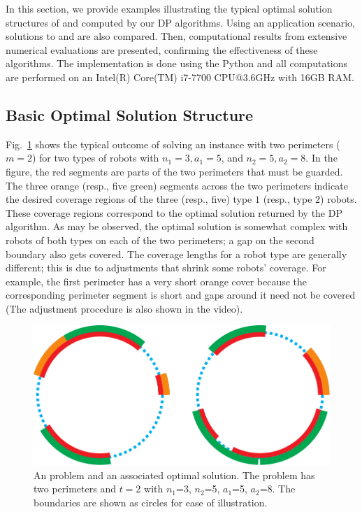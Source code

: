 In this section, we provide examples illustrating the typical 
optimal solution structures of \opglr and \opgmc computed by 
our DP algorithms. Using an application scenario, solutions to 
\opglr and \opgmc are also compared. Then, computational 
results from extensive numerical evaluations are presented, 
confirming the effectiveness of these algorithms. The 
implementation is done using the Python and all 
computations are performed on an Intel(R) Core(TM) i7-7700 CPU@3.6GHz 
with 16GB RAM. 

\subsection{Basic Optimal Solution Structure}
Fig.~\ref{fig:opgext-opglrm} shows the typical outcome of solving an \opglr 
instance with two perimeters ($m = 2$) for two types of robots with 
$n_1 = 3, a_1 = 5$, and $n_2 = 5, a_2 = 8$. 
In the figure, the red segments are parts of the two perimeters that 
must be guarded. The three orange (resp., five green) segments across 
the two perimeters indicate the desired coverage regions of the three 
(resp., five) type $1$ (resp., type $2$) robots. These coverage regions 
correspond to the optimal solution returned by the DP algorithm. As 
may be observed, the optimal solution is somewhat complex with robots 
of both types on each of the two perimeters; a gap on the second boundary 
also gets covered. The coverage lengths for a robot type are generally 
different; this is due to adjustments that shrink some robots' coverage. 
For example, the first perimeter has a very short orange cover because 
the corresponding perimeter segment is short and gaps around it need 
not be covered (The adjustment procedure is also shown in the video). 
\begin{figure}[!ht]
    \centering
    \includegraphics[scale = 0.6]{chapters/opg-ext/figures/mopglr_shrink-new-eps-converted-to.pdf}
    \caption{An \opglr problem and an associated optimal solution. The 
		problem has two perimeters and $t = 2$ with $n_1$=3, $n_2$=5, 
		$a_1$=5, $a_2$=8. The boundaries are shown as circles for ease of 
		illustration.
		}
		\label{fig:opgext-opglrm}
\end{figure}

